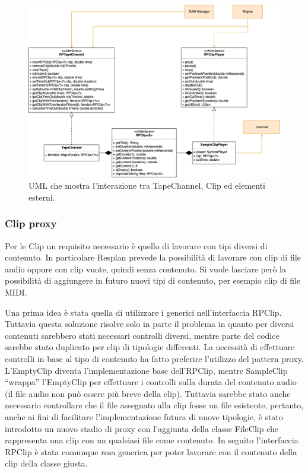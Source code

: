 \documentclass[a4paper,12pt]{report}
\begin{document}
\begin{figure}[H]
\centering{}
\includegraphics[width=\textwidth]{img/tapechannel.png}
\caption{UML che mostra l'interazione tra TapeChannel, Clip ed elementi esterni.}
\end{figure}

\subsubsection{Clip proxy}
Per le Clip un requisito necessario è quello di lavorare con tipi diversi di contenuto. In particolare Resplan prevede la possibilità di lavorare con clip di file audio oppure con clip vuote, quindi senza contenuto. Si vuole lasciare però la possibilità di aggiungere in futuro nuovi tipi di contenuto, per esempio clip di file MIDI.

Una prima idea è stata quella di utilizzare i generici nell’interfaccia RPClip. Tuttavia questa soluzione risolve solo in parte il problema in quanto per diversi contenuti sarebbero stati necessari controlli diversi, mentre parte del codice sarebbe stato duplicato per clip di tipologie differenti.
La necessità di effettuare controlli in base al tipo di contenuto ha fatto preferire l’utilizzo del pattern proxy.
L’EmptyClip diventa l’implementazione base dell’RPClip, mentre SampleClip “wrappa” l’EmptyClip per effettuare i controlli sulla durata del contenuto audio (il file audio non può essere più breve della clip).
Tuttavia sarebbe stato anche necessario controllare che il file assegnato alla clip fosse un file esistente, pertanto, anche ai fini di facilitare l’implementazione futura di nuove tipologie, è stato introdotto un nuovo stadio di proxy con l’aggiunta della classe FileClip che rappresenta una clip con un qualsiasi file come contenuto.
In seguito l’interfaccia RPClip è stata comunque resa generica per poter lavorare con il contenuto della clip della classe giusta.
\end{document}
